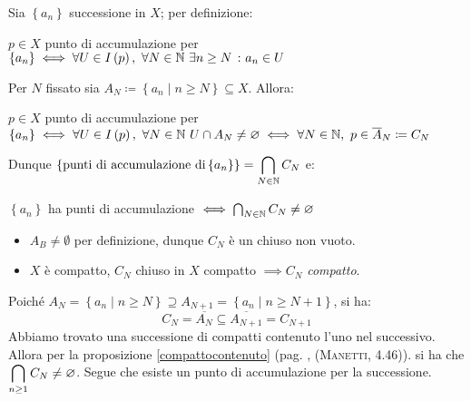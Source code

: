\begin{demonstration}
Sia	$\left\{a_n\right\}$ successione in $X$; per definizione:
\begin{center}
$p\in X$ punto di accumulazione per $\left\{a_n\right\}\iff \forall U\in I\left(p\right),\ \forall N\in\mathbb{N}\ \exists n\geq N\ \colon a_n\in U$
\end{center}
Per $N$ fissato sia $A_N\coloneqq \left\{a_n\mid n\geq N\right\}\subseteq X$. Allora:
\begin{center}
	$p\in X$ punto di accumulazione per $\displaystyle\left\{a_n\right\}\iff \forall U\in I\left(p\right),\ \forall N\in\mathbb{N}\ U\cap A_N\neq\varnothing\iff \forall N\in\mathbb{N},\ p\in\overline{A}_N\coloneqq C_N$
\end{center}
Dunque $\displaystyle\left\{\text{punti di accumulazione di} \left\{a_n\right\}\right\}=\mathop{{\bigcap}}\displaylimits_{N\in\mathbb{N}}C_N$ e:
 \begin{center}
 	$\left\{a_n\right\}$ ha punti di accumulazione $\iff \mathop{{\bigcap}}\displaylimits_{N\in\mathbb{N}}C_N\neq\varnothing$
 \end{center}
\begin{itemize}
	\item $A_B\neq \emptyset$ per definizione, dunque $C_N$ è un chiuso non vuoto.
	\item $X$ è compatto, $C_N$ chiuso in $X$ compatto $\implies C_N$ \textit{compatto}.
\end{itemize}
Poiché $A_N=\left\{a_n\mid n\geq N\right\}\supseteq A_ {N+1}=\left\{a_n\mid n\geq N+1\right\}$, si ha:
\begin{equation*}
C_N=\overline{A_N}\subseteq \overline{A_{N+1}}=C_{N+1}
\end{equation*}
Abbiamo trovato una successione di compatti contenuto l'uno nel successivo. Allora per la proposizione \ref{compattocontenuto} (pag. \pageref{compattocontenuto}, \textsc{(Manetti, 4.46)}). si ha che $\displaystyle\mathop{{\bigcap}}\displaylimits_{n\geq 1}C_N\neq \varnothing$.
Segue che esiste un punto di accumulazione per la successione.
\end{demonstration}
